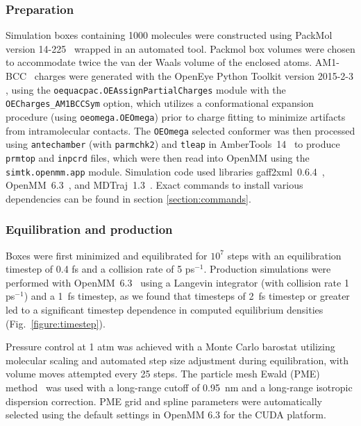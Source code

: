 \documentclass[aps,pre,twocolumn,nofootinbib,superscriptaddress,linenumbers]{revtex4-1}
\begin{document}
\subsubsection{Preparation}
\label{section:preparation}

Simulation boxes containing 1000 molecules were constructed using PackMol version 14-225~\cite{martinez2009packmol, packmolurl} wrapped in an automated tool.
Packmol box volumes were chosen to accommodate twice the van der Waals volume of the enclosed atoms.  
AM1-BCC~\cite{am1bcc1,am1bcc2, velez2014time} charges were generated with the OpenEye Python Toolkit version 2015-2-3 \cite{openeye}, using the {\tt oequacpac.OEAssignPartialCharges} module with the {\tt OECharges\_AM1BCCSym} option, which utilizes a conformational expansion procedure (using {\tt oeomega.OEOmega}) prior to charge fitting to minimize artifacts from intramolecular contacts.  
The {\tt OEOmega} selected conformer was then processed using {\tt antechamber} (with {\tt parmchk2}) and {\tt tleap} in AmberTools~14~\cite{amber14} to produce {\tt prmtop} and {\tt inpcrd} files, which were then read into OpenMM using the {\tt simtk.openmm.app} module.
Simulation code used libraries gaff2xml~0.6.4~\cite{gaff2xml}, OpenMM~6.3~\cite{eastman2012openmm}, and MDTraj~1.3~\cite{mcgibbon2014mdtraj}.  
Exact commands to install various dependencies can be found in section \ref{section:commands}.

\subsubsection{Equilibration and production}
\label{section:production}

Boxes were first minimized and equilibrated for $10^7$ steps with an equilibration timestep of 0.4 fs and a collision rate of 5 ps$^{-1}$.  
Production simulations were performed with OpenMM~6.3~\cite{eastman2012openmm} using a Langevin integrator (with collision rate 1 ps$^{-1}$) and a 1~fs timestep, as we found that timesteps of 2~fs timestep or greater led to a significant timestep dependence in computed equilibrium densities (Fig.~\ref{figure:timestep}).  

Pressure control at 1 atm was achieved with a Monte Carlo barostat utilizing molecular scaling and automated step size adjustment during equilibration, with volume moves attempted every 25 steps.  
The particle mesh Ewald (PME) method~\cite{Darden1993} was used with a long-range cutoff of 0.95~nm and a long-range isotropic dispersion correction. 
PME grid and spline parameters were automatically selected using the default settings in OpenMM 6.3 for the CUDA platform.
\end{document}
